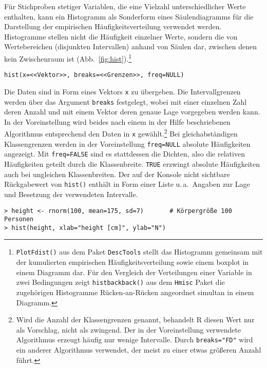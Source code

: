 Für Stichproben stetiger Variablen, die eine Vielzahl unterschiedlicher Werte enthalten, kann ein Histogramm als Sonderform eines Säulendiagramms für die Darstellung der empirischen Häufigkeitsverteilung verwendet werden. Histogramme stellen nicht die Häufigkeit einzelner Werte, sondern die von Wertebereichen (disjunkten Intervallen) anhand von Säulen dar, zwischen denen kein Zwischenraum ist (Abb.\ \ref{fig:hist}).\footnote{\lstinline!PlotFdist()! aus dem Paket \lstinline!DescTools! stellt das Histogramm gemeinsam mit der kumulierten empirischen Häufigkeitsverteilung sowie einem boxplot in einem Diagramm dar. Für den Vergleich der Verteilungen einer Variable in zwei Bedingungen zeigt \lstinline!histbackback()! aus dem \lstinline!Hmisc! Paket die zugehörigen Histogramme Rücken-an-Rücken angeordnet simultan in einem Diagramm.}
\begin{lstlisting}
hist(x=<<Vektor>>, breaks=<<Grenzen>>, freq=NULL)
\end{lstlisting}

Die Daten sind in Form eines Vektors \lstinline!x! zu übergeben. Die Intervallgrenzen werden über das Argument \lstinline!breaks! festgelegt, wobei mit einer einzelnen Zahl deren Anzahl und mit einem Vektor deren genaue Lage vorgegeben werden kann. In der Voreinstellung wird beides nach einem in der Hilfe beschriebenen Algorithmus entsprechend den Daten in \lstinline!x! gewählt.\footnote{Wird die Anzahl der Klassengrenzen genannt, behandelt R diesen Wert nur als Vorschlag, nicht als zwingend. Der in der Voreinstellung verwendete Algorithmus erzeugt häufig nur wenige Intervalle. Durch \lstinline!breaks="FD"! wird ein anderer Algorithmus verwendet, der meist zu einer etwas größeren Anzahl führt.} Bei gleichabständigen Klassengrenzen werden in der Voreinstellung \lstinline!freq=NULL! absolute Häufigkeiten angezeigt. Mit \lstinline!freq=FALSE! sind es stattdessen die Dichten, also die relativen Häufigkeiten geteilt durch die Klassenbreite. \lstinline!TRUE! erzwingt absolute Häufigkeiten auch bei ungleichen Klassenbreiten. Der auf der Konsole nicht sichtbare Rückgabewert von \lstinline!hist()! enthält in Form einer Liste u.\,a.\ Angaben zur Lage und Besetzung der verwendeten Intervalle.
\begin{lstlisting}
> height <- rnorm(100, mean=175, sd=7)       # Körpergröße 100 Personen
> hist(height, xlab="height [cm]", ylab="N")
\end{lstlisting}

